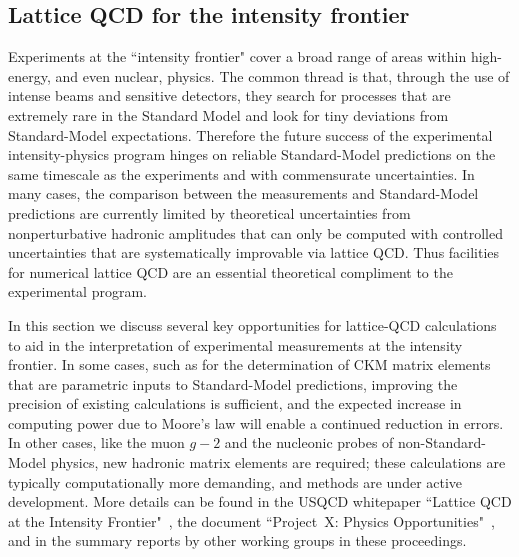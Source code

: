 \subsection{Lattice QCD for the intensity frontier}
\label{subsec:lqcd:IF}

Experiments at the ``intensity frontier" cover a broad range of areas within high-energy, and even nuclear, physics.  The common thread is that, through the use of intense beams and sensitive detectors, they search for processes that are extremely rare in the Standard Model and look for tiny deviations from Standard-Model
expectations.  Therefore the future success of the experimental intensity-physics program hinges on reliable Standard-Model predictions on the same
timescale as the experiments and with commensurate uncertainties.  In many cases, the comparison between the measurements and Standard-Model predictions are currently limited by theoretical uncertainties from nonperturbative hadronic amplitudes that can only be computed with controlled uncertainties that are systematically improvable via lattice QCD.  Thus facilities for numerical lattice QCD are an essential theoretical compliment to the experimental program.
  
In this section we discuss several key opportunities for lattice-QCD calculations to aid in the
interpretation of experimental measurements at the intensity frontier.  In some cases, such as for the determination of CKM matrix elements that are parametric inputs to
Standard-Model predictions, improving the precision of existing calculations is sufficient, and the expected
increase in computing power due to Moore's law will enable a continued reduction in errors.
In other cases, like the muon $g-2$ and the nucleonic probes of non-Standard-Model physics, new hadronic matrix elements
are required; these calculations are typically computationally more demanding, and methods are
under active development.  More details can be found in the USQCD whitepaper ``Lattice QCD at the Intensity Frontier"~\cite{USQCD_IF_whitepaper13}, the document ``Project~X: Physics Opportunities"~\cite{Kronfeld:2013uoa}, and in the summary reports by other working groups in these proceedings. 

